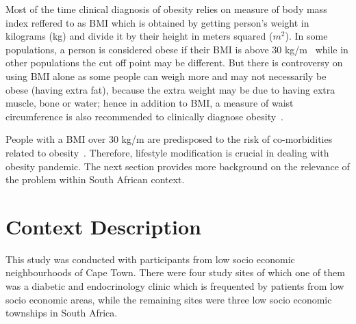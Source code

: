 Most of the time clinical diagnosis of obesity relies on measure of body mass index reffered to as BMI  which is obtained by getting person’s weight in kilograms (kg) and divide it by their height in meters squared ($m^2$). In some populations, a person is considered obese if their BMI is above 30 kg/m~\citep{steyn2006chronic} while in other populations the cut off point may be different. But there is controversy on using BMI alone as some people can weigh more and may not necessarily be obese (having extra fat), because the extra weight may be due to having extra muscle, bone or water; hence in addition to BMI, a measure of waist circumference is also recommended to clinically diagnose obesity~\citep{janssen2004waist}. 

People with a BMI over 30 kg/m are predisposed to the risk of co-morbidities related to obesity~\citep{de2000clinical}. Therefore, lifestyle modification is crucial in dealing with obesity pandemic. The next section provides more background on the relevance of the problem within South African context.
\section{Context Description}
This study was conducted with participants from low socio economic neighbourhoods of Cape Town. There were four study sites of which one of them was a diabetic and endocrinology clinic which is frequented by patients from low socio economic areas, while the remaining sites were three low socio economic townships in South Africa. 

